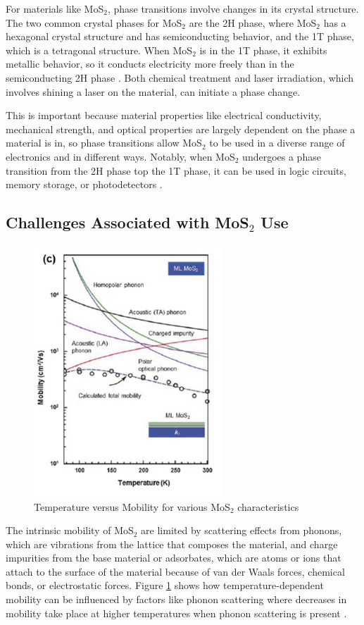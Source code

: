 \documentclass[conference]{IEEEtran}
\begin{document}
For materials like MoS$_2$, phase transitions involve changes in its crystal structure. The two common crystal phases for MoS$_2$ are the 2H phase, where MoS$_2$ has a hexagonal crystal structure and has semiconducting behavior, and the 1T phase, which is a tetragonal structure. When MoS$_2$ is in the 1T phase, it exhibits metallic behavior, so it conducts electricity more freely than in the semiconducting 2H phase \cite{oa4}. Both chemical treatment and laser irradiation, which involves shining a laser on the material, can initiate a phase change. 

This is important because material properties like electrical conductivity, mechanical strength, and optical properties are largely dependent on the phase a material is in, so phase transitions allow MoS$_2$ to be used in a diverse range of electronics and in different ways. Notably, when MoS$_2$ undergoes a phase transition from the 2H phase top the 1T phase, it can be used in logic circuits, memory storage, or photodetectors \cite{oa4}.

\subsection{Challenges Associated with MoS$_2$ Use}

\begin{figure}[h]
  \centering
  \includegraphics[width=.5\textwidth]{Figures/MOS2}
  \caption{Temperature versus Mobility for various MoS$_2$ characteristics \cite{oa5}}
  \label{fig:3}
\end{figure}

The intrinsic mobility of MoS$_2$ are limited by scattering effects from phonons, which are vibrations from the lattice that composes the material, and charge impurities from the base material or adsorbates, which are atoms or ions that attach to the surface of the material because of van der Waals forces, chemical bonds, or electrostatic forces. Figure \ref{fig:3} shows how temperature-dependent mobility can be influenced by factors like phonon scattering where decreases in mobility take place at higher temperatures when phonon scattering is present \cite{oa5}.
\end{document}
